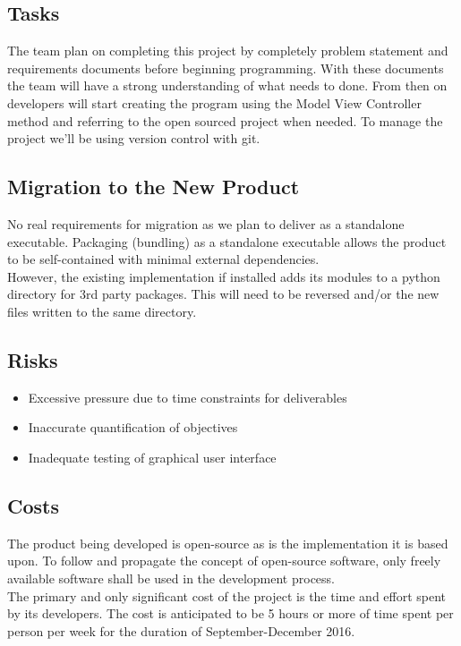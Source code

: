 \documentclass{article}
\begin{document}
		\subsection{Tasks}
		\indent \indent The team plan on completing this project by completely problem statement and requirements documents before beginning programming. With these documents the team will have a strong understanding of what needs to done. From then on developers will start creating the program using the Model View Controller method and referring to the open sourced project when needed. To manage the project we’ll be using version control with git. \\


		\subsection{Migration to the New Product}
		\indent \indent No real requirements for migration as we plan to deliver as a standalone executable. Packaging (bundling) as a standalone executable allows the product to be self-contained with minimal external dependencies.\\
		\indent However, the existing implementation if installed adds its modules to a python directory for 3rd party packages. This will need to be reversed and/or the new files written to the same directory.\\

		\subsection{Risks}
		\begin{itemize}
			\itemsep0em
			\item Excessive pressure due to time constraints for deliverables
			\item Inaccurate quantification of objectives
			\item Inadequate testing of graphical user interface
		\end{itemize}

		\subsection{Costs}
		\indent \indent The product being developed is open-source as is the implementation it is based upon. To follow and propagate the concept of open-source software, only freely available software shall be used in the development process. \\
		\indent The primary and only significant cost of the project is the time and effort spent by its developers. The cost is anticipated to be 5 hours or more of time spent per person per week for the duration of September-December 2016.\\
\end{document}
